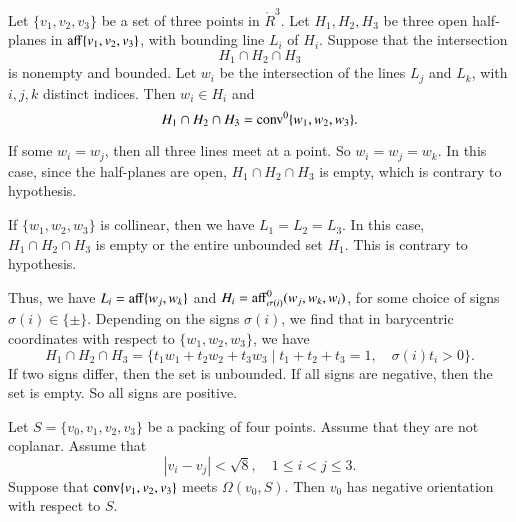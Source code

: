 \begin{tarskidata}
\begin{tarski}
\begin{lemma}
Let $\{v_1,v_2,v_3\}$ be a set of three points
in $\ring{R}^3$.  Let $H_1,H_2,H_3$ be three open half-planes in
${\operatorname{aff}}\{v_1,v_2,v_3\}$, with bounding line $L_i$ of $H_i$.  
Suppose that the intersection
   $$H_1\cap H_2\cap H_3$$
is nonempty and bounded.  Let $w_i$ be the intersection of the
lines $L_j$ and $L_k$, with $i,j,k$ distinct indices.  Then
$w_i\in H_i$ and
   $$H_1\cap H_2\cap H_3 = {\operatorname{conv}}^0\{w_1,w_2,w_3\}.$$
\end{lemma}

\begin{proved}  If some $w_i=w_j$, then all three lines meet
at a point.  So $w_i=w_j=w_k$.  In this case, since the half-planes
are open, $H_1\cap H_2\cap H_3$ is empty, which is contrary to 
hypothesis.  

If $\{w_1,w_2,w_3\}$ is collinear, then we have $L_1=L_2=L_3$.
In this case, $H_1\cap H_2\cap H_3$ is empty or the entire
unbounded set $H_1$.  This is contrary to hypothesis.

Thus, we have $L_i = {\operatorname{aff}}\{w_j,w_k\}$ and
$H_i = {\operatorname{aff}}^0_{\sigma(i)}({w_j,w_k},w_i)$, for some choice of
signs $\sigma(i)\in\{\pm\}$.  
Depending on the signs $\sigma(i)$, we find that in barycentric
coordinates with respect to $\{w_1,w_2,w_3\}$, we have
  $$H_1\cap H_2\cap H_3 =
    \{ t_1 w_1 + t_2 w_2 +t_3 w_3 \mid
         t_1 + t_2 + t_3 = 1,\quad  \sigma(i)t_i > 0\}.$$
If two signs differ, then the set is unbounded.  If all signs
are negative, then the set is empty.  So all signs are positive.
\swallowed\end{proved}
\end{tarski}






\begin{tarski}

\begin{lemma}
Let $S=\{v_0,v_1,v_2,v_3\}$ be a packing of four points.
Assume that they are not coplanar.
Assume that 
$$
|v_i-v_j|<\sqrt8,\quad 1\le i < j \le 3.
$$
  Suppose that
${\operatorname{conv}}\{v_1,v_2,v_3\}$ meets $\Omega(v_0,S)$.  Then $v_0$ has negative
orientation with respect to $S$.
\end{lemma}


\end{tarski}
\end{tarskidata}
